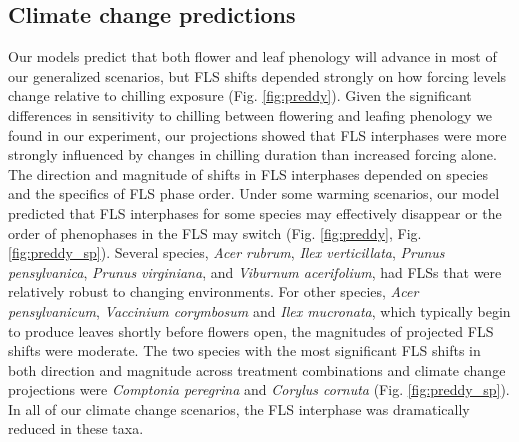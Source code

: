 \documentclass[11pt]{article}\usepackage[]{graphicx}\usepackage[]{color}
\begin{document}
\subsection*{Climate change predictions}
\noindent Our models predict that both flower and leaf phenology will advance in most of our generalized scenarios, but FLS shifts depended strongly on how forcing levels change relative to chilling exposure (Fig. \ref{fig:preddy}). Given the significant differences in sensitivity to chilling between flowering and leafing phenology we found in our experiment, our projections showed that FLS interphases were more strongly influenced by changes in chilling duration than increased forcing alone.\\ 

\noindent The direction and magnitude of shifts in FLS interphases depended on species and the specifics of FLS phase order. Under some warming scenarios, our model predicted that  FLS interphases for some species may effectively disappear or the order of phenophases in the FLS may switch (Fig. \ref{fig:preddy}, Fig. \ref{fig:preddy_sp}). Several species, \textit{Acer rubrum}, \textit{Ilex verticillata}, \textit{Prunus pensylvanica}, \textit{Prunus virginiana}, and \textit{Viburnum acerifolium}, had FLSs that were relatively robust to changing environments. For other species, \textit{Acer pensylvanicum}, \textit{Vaccinium corymbosum} and \textit{Ilex mucronata}, which typically begin to produce leaves shortly before flowers open, the magnitudes of projected FLS shifts were moderate. The two species with the most significant FLS shifts in both direction and magnitude across treatment combinations and climate change projections were \textit{Comptonia peregrina} and \textit{Corylus cornuta} (Fig. \ref{fig:preddy_sp}). In all of our climate change scenarios, the FLS interphase was dramatically reduced in these taxa.\\
\end{document}

